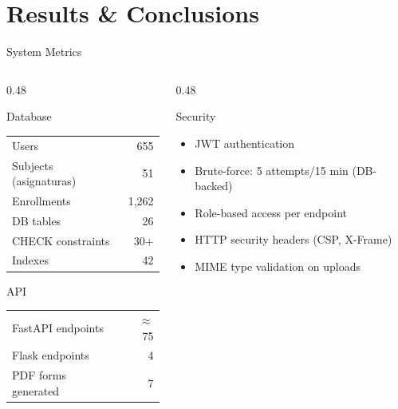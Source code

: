\documentclass[aspectratio=169,12pt]{beamer}
\begin{document}
\section{Results \& Conclusions}

\begin{frame}{System Metrics}
  \begin{columns}[T]
    \begin{column}{0.48\textwidth}
      \begin{block}{Database}
        \footnotesize
        \begin{tabular}{lr}
          Users & 655 \\
          Subjects (asignaturas) & 51 \\
          Enrollments & 1,262 \\
          DB tables & 26 \\
          CHECK constraints & 30+ \\
          Indexes & 42 \\
        \end{tabular}
      \end{block}
      \vspace{0.2cm}
      \begin{block}{API}
        \footnotesize
        \begin{tabular}{lr}
          FastAPI endpoints & $\approx$75 \\
          Flask endpoints & 4 \\
          PDF forms generated & 7 \\
        \end{tabular}
      \end{block}
    \end{column}
    \begin{column}{0.48\textwidth}
      \begin{block}{Security}
        \footnotesize
        \begin{itemize}
          \item JWT authentication
          \item Brute-force: 5 attempts/15 min (DB-backed)
          \item Role-based access per endpoint
          \item HTTP security headers (CSP, X-Frame)
          \item MIME type validation on uploads

\end{itemize}
\end{block}
\end{column}
\end{columns}
\end{frame}
\end{document}
